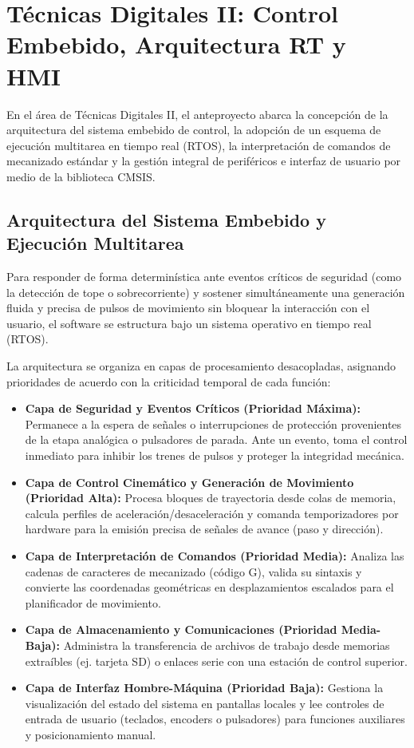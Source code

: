 \chapter{Técnicas Digitales II: Control Embebido, Arquitectura RT y HMI}
\label{sec:tecnicas_digitales_2}

En el área de Técnicas Digitales II, el anteproyecto abarca la concepción de la arquitectura del sistema embebido de
control, la adopción de un esquema de ejecución multitarea en tiempo real (RTOS), la interpretación de comandos de
mecanizado estándar y la gestión integral de periféricos e interfaz de usuario por medio de la biblioteca CMSIS.

\section{Arquitectura del Sistema Embebido y Ejecución Multitarea}
\label{sec:td2_freertos}

Para responder de forma determinística ante eventos críticos de seguridad (como la detección de tope o sobrecorriente)
y sostener simultáneamente una generación fluida y precisa de pulsos de movimiento sin bloquear la interacción con el
usuario, el software se estructura bajo un sistema operativo en tiempo real (RTOS).

La arquitectura se organiza en capas de procesamiento desacopladas, asignando prioridades de acuerdo con la
criticidad temporal de cada función:

\begin{itemize}
  \item \textbf{Capa de Seguridad y Eventos Críticos (Prioridad Máxima):} Permanece a la espera de señales o
    interrupciones de protección provenientes de la etapa analógica o pulsadores de parada. Ante un evento, toma el
    control inmediato para inhibir los trenes de pulsos y proteger la integridad mecánica.
  \item \textbf{Capa de Control Cinemático y Generación de Movimiento (Prioridad Alta):} Procesa bloques de trayectoria
    desde colas de memoria, calcula perfiles de aceleración/desaceleración y comanda temporizadores por hardware para
    la emisión precisa de señales de avance (paso y dirección).
  \item \textbf{Capa de Interpretación de Comandos (Prioridad Media):} Analiza las cadenas de caracteres de mecanizado
    (código G), valida su sintaxis y convierte las coordenadas geométricas en desplazamientos escalados para el
    planificador de movimiento.
  \item \textbf{Capa de Almacenamiento y Comunicaciones (Prioridad Media-Baja):} Administra la transferencia de
    archivos de trabajo desde memorias extraíbles (ej. tarjeta SD) o enlaces serie con una estación de control superior.
  \item \textbf{Capa de Interfaz Hombre-Máquina (Prioridad Baja):} Gestiona la visualización del estado del sistema en
    pantallas locales y lee controles de entrada de usuario (teclados, encoders o pulsadores) para funciones auxiliares
    y posicionamiento manual.
\end{itemize}

